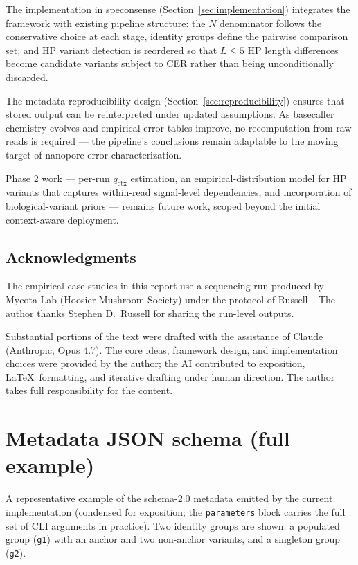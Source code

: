 \documentclass[11pt]{article}
\begin{document}
The implementation in speconsense (Section~\ref{sec:implementation}) integrates
the framework with existing pipeline structure: the $N$ denominator follows
the conservative choice at each stage, identity groups define the pairwise
comparison set, and HP variant detection is reordered so that $L \leq 5$ HP
length differences become candidate variants subject to CER rather than being
unconditionally discarded.

The metadata reproducibility design (Section~\ref{sec:reproducibility}) ensures
that stored output can be reinterpreted under updated assumptions. As
basecaller chemistry evolves and empirical error tables improve, no
recomputation from raw reads is required --- the pipeline's conclusions remain
adaptable to the moving target of nanopore error characterization.

Phase 2 work --- per-run $q_\text{ctx}$ estimation, an empirical-distribution
model for HP variants that captures within-read signal-level dependencies, and
incorporation of biological-variant priors --- remains future work, scoped
beyond the initial context-aware deployment.

\subsection*{Acknowledgments}

The empirical case studies in this report use a sequencing run produced by
Mycota Lab (Hoosier Mushroom Society) under the protocol of
Russell~\cite{russell2023}. The author thanks Stephen D.~Russell for sharing
the run-level outputs.

Substantial portions of the text were drafted with the assistance of Claude
(Anthropic, Opus 4.7). The core ideas, framework design, and implementation
choices were provided by the author; the AI contributed to exposition,
\LaTeX\ formatting, and iterative drafting under human direction. The author
takes full responsibility for the content.

\appendix

\section{Metadata JSON schema (full example)}
\label{app:schema}

A representative example of the schema-2.0 metadata emitted by the current
implementation (condensed for exposition; the \texttt{parameters} block carries
the full set of CLI arguments in practice). Two identity groups are shown: a
populated group (\texttt{g1}) with an anchor and two non-anchor variants, and
a singleton group (\texttt{g2}).
\end{document}
